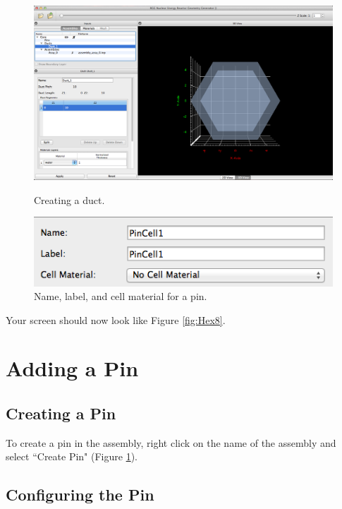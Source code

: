 \begin{figure}[t]
\begin{minipage}{.5\textwidth}
  \begin{center}
		\includegraphics[width=0.95\linewidth]{Images/hex-duct-result.png}
		\caption{Creating a duct.}
		\label{fig:Hex8}
	\end{center}
	\vspace{55pt}
	\begin{center}
		\includegraphics[width=0.95\linewidth]{Images/hex-default-pin-params.png}
		\caption{Name, label, and cell material for a pin.}
		\label{fig:Hex10}
	\end{center}
\end{minipage}
\end{figure}

Your screen should now look like Figure \ref{fig:Hex8}.

\section{Adding a Pin}
\subsection{Creating a Pin}

To create a pin in the assembly, right click on the name of the assembly and select ``Create Pin" (Figure \ref{fig:Hex10}).

\subsection{Configuring the Pin}

